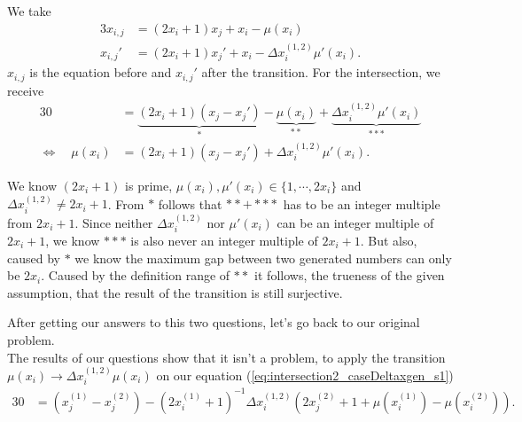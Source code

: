 \begin{enumerate}
	We take
	\begin{alignat}{3}
		x_{i,j} &= \left(2x_{i} + 1\right)x_{j} + x_{i} - \mu\left(x_{i}\right) \label{eq:question2_eq1} \\
		x_{i,j}\prime &= \left(2x_{i} + 1\right)x_{j}\prime + x_{i} - \Delta x_{i}^{\left(1,2\right)}\mu\prime\left(x_{i}\right) \label{eq:question2_eq2}.
	\end{alignat}
	$x_{i,j}$ is the equation before and $x_{i,j}\prime$ after the transition. For the intersection, we receive
	\begin{alignat}{3}
		0 &= \underbrace{\left(2x_{i} + 1\right)\left(x_{j} - x_{j}\prime\right)}_{*} - \underbrace{\mu\left(x_{i}\right)}_{**} + \underbrace{\Delta x_{i}^{\left(1,2\right)}\mu\prime\left(x_{i}\right)}_{***} \label{eq:question2_intersec} \\
		\Leftrightarrow \quad \mu\left(x_{i}\right) &= \left(2x_{i} + 1\right)\left(x_{j} - x_{j}\prime\right) + \Delta x_{i}^{\left(1,2\right)}\mu\prime\left(x_{i}\right). \label{eq:question2_intersec}
	\end{alignat}
	
	We know $\left(2x_{i} + 1\right)$ is prime, $\mu\left(x_{i}\right), \mu\prime\left(x_{i}\right) \in \{1, \cdots, 2x_{i}\}$ and $\Delta x_{i}^{\left(1,2\right)} \neq 2x_{i} + 1$. From $*$ follows that $** + ***$ has to be an integer multiple from $2x_{i} + 1$. Since neither $\Delta x_{i}^{\left(1,2\right)}$ nor $\mu\prime\left(x_{i}\right)$ can be an integer multiple of $2x_{i} + 1$, we know $***$ is also never an integer multiple of $2x_{i} + 1$. But also, caused by $*$ we know the maximum gap between two generated numbers can only be $2x_{i}$. Caused by the definition range of $**$ it follows, the trueness of the given assumption, that the result of the transition is still surjective.

\label{en:transitionquestions}
\end{enumerate}

After getting our answers to this two questions, let's go back to our original problem.\\

The results of our questions show that it isn't a problem, to apply the transition $\mu\left(x_{i}\right) \rightarrow \Delta x_{i}^{\left(1,2\right)}\mu\left(x_{i}\right)$ on our equation (\ref{eq:intersection2_caseDeltaxgen_s1})
\begin{alignat}{3}
	0 & = \left(x_{j}^{\left(1\right)} - x_{j}^{\left(2\right)}\right) - \left(2x_{i}^{\left(1\right)} + 1\right)^{-1} \Delta x_{i}^{\left(1,2\right)}\left(2x_{j}^{\left(2\right)} + 1 + \mu\left(x_{i}^{\left(1\right)} \right) - \mu\left(x_{i}^{\left(2\right)}\right)\right). \label{eq:intersection2_caseDeltaxgen_s2_transition_s1}
\end{alignat}

